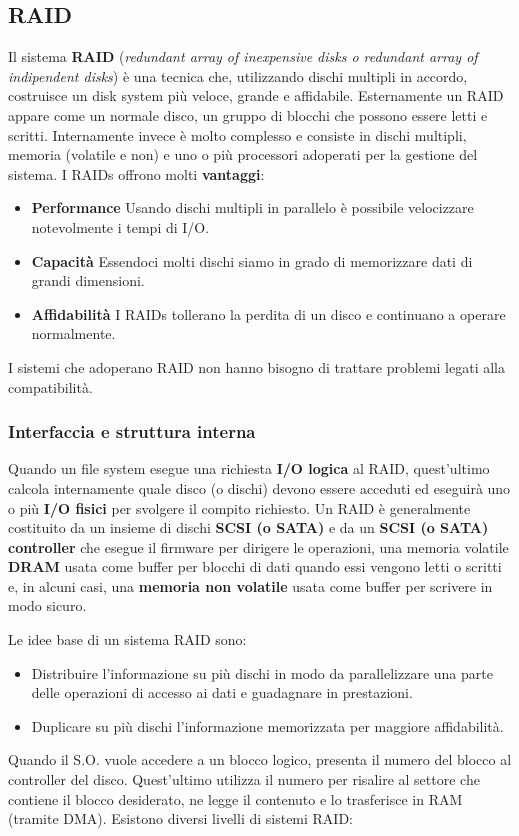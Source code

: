 \documentclass[12pt, twoside, letterpaper]{article}
\begin{document}
		\subsection{RAID}
			Il sistema \textbf{RAID} (\textit{redundant array of inexpensive disks o redundant array of indipendent disks}) è una tecnica che, utilizzando dischi multipli in accordo, costruisce un disk system più veloce, grande e affidabile. Esternamente un RAID appare come un normale disco, un gruppo di blocchi che possono essere letti e scritti. Internamente invece è molto complesso e consiste in dischi multipli, memoria (volatile e non) e uno o più processori adoperati per la gestione del sistema. I RAIDs offrono molti \textbf{vantaggi}:
			\begin{itemize}
				\item \textbf{Performance} Usando dischi multipli in parallelo è possibile velocizzare notevolmente i tempi di I/O.
				\item \textbf{Capacità} Essendoci molti dischi siamo in grado di memorizzare dati di grandi dimensioni. 
				\item \textbf{Affidabilità} I RAIDs tollerano la perdita di un disco e continuano a operare normalmente.
			\end{itemize}
			I sistemi che adoperano RAID non hanno bisogno di trattare problemi legati alla compatibilità.
			
			\subsubsection{Interfaccia e struttura interna}
				Quando un file system esegue una richiesta \textbf{I/O logica} al RAID, quest'ultimo calcola internamente quale disco (o dischi) devono essere acceduti ed eseguirà uno o più \textbf{I/O fisici} per svolgere il compito richiesto. Un RAID è generalmente costituito da un insieme di dischi \textbf{SCSI (o SATA)} e da un \textbf{SCSI (o SATA) controller}  che esegue il firmware per dirigere le operazioni, una memoria volatile \textbf{DRAM} usata come buffer per blocchi di dati quando essi vengono letti o scritti e, in alcuni casi, una \textbf{memoria non volatile} usata come buffer per scrivere in modo sicuro.
				
				Le idee base di un sistema RAID sono:
				\begin{itemize}
					\item Distribuire l'informazione su più dischi in modo da parallelizzare una parte delle operazioni di accesso ai dati e guadagnare in prestazioni.
					\item Duplicare su più dischi l'informazione memorizzata per maggiore affidabilità. 
				\end{itemize}
				Quando il S.O. vuole accedere a un blocco logico, presenta il numero del blocco al controller del disco. Quest'ultimo utilizza il numero per risalire al settore che contiene il blocco desiderato, ne legge il contenuto e lo trasferisce in RAM (tramite DMA). Esistono diversi livelli di sistemi RAID:
				
\end{document}
